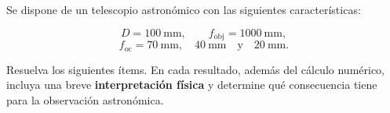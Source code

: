 Se dispone de un telescopio astronómico con las siguientes características:

\begin{center}
\begin{tcolorbox}[width=0.72\textwidth,colback=blue!4,colframe=blue!55!black,
                  title=Datos del telescopio]
\[
    D=100~\text{mm},
    \qquad
    f_{\text{obj}}=1000~\text{mm},
\]
\[
    f_{\text{oc}}=70~\text{mm},\quad 40~\text{mm}
    \quad\text{y}\quad 20~\text{mm}.
\]
\end{tcolorbox}
\end{center}

Resuelva los siguientes ítems. En cada resultado, además del cálculo numérico,
incluya una breve \textbf{interpretación física} y determine qué consecuencia
tiene para la observación astronómica.

